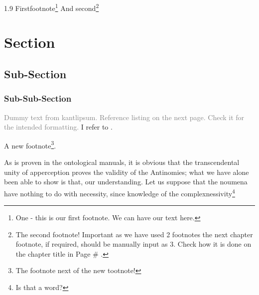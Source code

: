 \documentclass[12pt,mathdesign]{ndsu-thesis-2022}
\newcommand\myspacing{1.9}%
\begin{document}
\begin{spacing}{\myspacing}
\kant[9]
Firstfootnote\footnote{One - this is our first footnote. We can have our text here.} And second\footnote{The second footnote! Important as we have used 2 footnotes the next chapter footnote, if required, should be manually input as 3. Check how it is done on the chapter title in Page \# \pageref{my2chap}.}


\kant[9]

\kant[2-4]


\checkEndRefsection%

\label{my2chap}

\checkBeginRefsection%

\kant[20-21]

\section{Section}
\subsection{Sub-Section}
\subsubsection{Sub-Sub-Section}

\textcolor{gray}{Dummy text from kantlipsum. Reference listing on the next page. Check it for the intended formatting.} I refer to \citep{butin2009education, rudestam2014surviving, Goossens2008g,cassuto2010advising,pires2021teens}. \kant[9]

A new footnote\footnote{The footnote next of the new tootnote!}.

As is proven in the ontological manuals, it is obvious that the transcendental unity of apperception proves the validity of the Antinomies; what we have alone been able to show is that, our understanding. Let us suppose that the noumena have nothing to do with necessity, since knowledge of the complexnessivity\footnote{Is that a word?}


\end{spacing}
\end{document}
